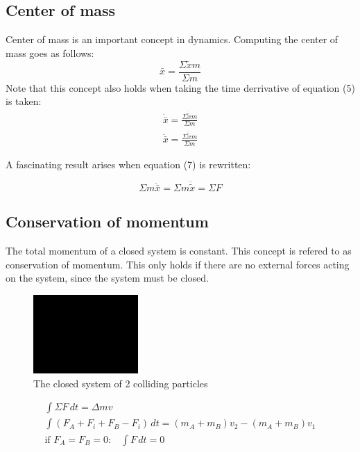\documentclass[11pt, a4paper]{article}
\begin{document}
\subsection{Center of mass}
Center of mass is an important concept in dynamics. Computing the center of mass goes as follows:
\begin{equation}
  \bar{x} = \frac{\Sigma \tilde{x}m}{\Sigma m}
\end{equation}
Note that this concept also holds when taking the time derrivative of equation (5) is taken:
\begin{gather}
  \dot{\bar{x}} = \frac{\Sigma \dot{\tilde{x}}m}{\Sigma m}\\
  \ddot{\bar{x}} = \frac{\Sigma \ddot{\tilde{x}}m}{\Sigma m}
\end{gather}

A fascinating result arises when equation (7) is rewritten:

\begin{equation}
  \Sigma m \ddot{\bar{x}} = \Sigma m\ddot{\tilde{x}} = \Sigma F
\end{equation}

\subsection{Conservation of momentum}
The total momentum of a closed system is constant. This concept is refered to as conservation of momentum.
This only holds if there are no external forces acting on the system, since the system must be closed.

\begin{figure}[h]
  \centerline{\includegraphics[width=40mm]{images/placeholder.png}}
  \caption{The closed system of 2 colliding particles}
\end{figure}

\begin{gather}
  \int \Sigma F\,dt = \Delta mv\\
  \int (F_A + F_i + F_B - F_i)\,dt = (m_A+m_B)v_2 - (m_A+m_B)v_1\\
  \text{if $F_A = F_B = 0$:} \quad \int F\,dt = 0
\end{gather}
\end{document}
